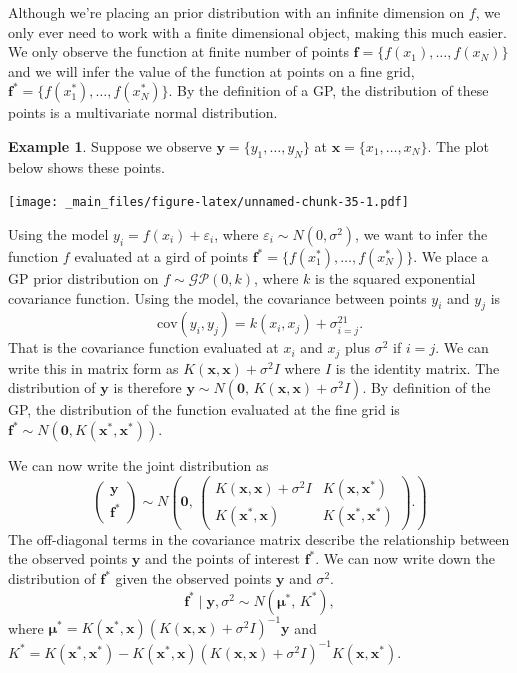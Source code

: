 \documentclass[
]{book}
\theoremstyle{definition}
\theoremstyle{definition}
\newtheorem{example}{Example}[chapter]
\theoremstyle{definition}
\theoremstyle{definition}
\theoremstyle{remark}
\begin{document}
Although we're placing an prior distribution with an infinite dimension on \(f\), we only ever need to work with a finite dimensional object, making this much easier. We only observe the function at finite number of points \(\boldsymbol{f} = \{f(x_1), \ldots, f(x_N)\}\) and we will infer the value of the function at points on a fine grid, \(\boldsymbol{f}^* = \{f(x_1^*), \ldots, f(x_N^*)\}\). By the definition of a GP, the distribution of these points is a multivariate normal distribution.

\begin{example}
Suppose we observe \(\boldsymbol{y} = \{y_1, \ldots, y_N\}\) at \(\boldsymbol{x} = \{x_1, \ldots, x_N\}\). The plot below shows these points.

\texttt{[image: \_main\_files/figure-latex/unnamed-chunk-35-1.pdf]}

Using the model \(y_i = f(x_i) + \varepsilon_i\), where \(\varepsilon_i \sim N(0, \sigma^2)\), we want to infer the function \(f\) evaluated at a gird of points \(\boldsymbol{f}^* = \{f(x_1^*), \ldots, f(x_N^*)\}\). We place a GP prior distribution on \(f \sim \mathcal{GP}(0, k)\), where \(k\) is the squared exponential covariance function. Using the model, the covariance between points \(y_i\) and \(y_j\) is
\[
\textrm{cov}(y_i, y_j) = k(x_i, x_j) + \sigma^21_{i=j}.
\]
That is the covariance function evaluated at \(x_i\) and \(x_j\) plus \(\sigma^2\) if \(i = j\). We can write this in matrix form as \(K(\boldsymbol{x}, \boldsymbol{x}) + \sigma^2I\) where \(I\) is the identity matrix. The distribution of \(\boldsymbol{y}\) is therefore \(\boldsymbol{y} \sim N(\boldsymbol{0}, \, K(\boldsymbol{x}, \boldsymbol{x}) + \sigma^2I)\). By definition of the GP, the distribution of the function evaluated at the fine grid is \(\boldsymbol{f}^* \sim N(\boldsymbol{0}, K(\boldsymbol{x}^*, \boldsymbol{x}^*))\).

We can now write the joint distribution as
\[
\begin{pmatrix}
\boldsymbol{y} \\
\boldsymbol{f}^*
\end{pmatrix} \sim N\left(\boldsymbol{0}, \,
\begin{pmatrix}
 K(\boldsymbol{x}, \boldsymbol{x}) + \sigma^2I &  K(\boldsymbol{x}, \boldsymbol{x}^*)\\
K(\boldsymbol{x}^*, \boldsymbol{x}) & K(\boldsymbol{x}^*, \boldsymbol{x}^*)
\end{pmatrix}.
\right)
\]
The off-diagonal terms in the covariance matrix describe the relationship between the observed points \(\boldsymbol{y}\) and the points of interest \(\boldsymbol{f}^*\). We can now write down the distribution of \(\boldsymbol{f}^*\) given the observed points \(\boldsymbol{y}\) and \(\sigma^2\).
\[
\boldsymbol{f}^* \mid \boldsymbol{y}, \sigma^2 \sim N(\boldsymbol{\mu}^*, \, K^*),
\]
where \(\boldsymbol{\mu}^* = K(\boldsymbol{x}^*, \boldsymbol{x})(K(\boldsymbol{x}, \boldsymbol{x}) + \sigma^2 I)^{-1} \boldsymbol{y}\) and \(K^* = K(\boldsymbol{x}^*, \boldsymbol{x}^*) - K(\boldsymbol{x}^*, \boldsymbol{x})(K(\boldsymbol{x}, \boldsymbol{x}) + \sigma^2I)^{-1}K(\boldsymbol{x}, \boldsymbol{x}^*)\).


\end{example}
\end{document}
